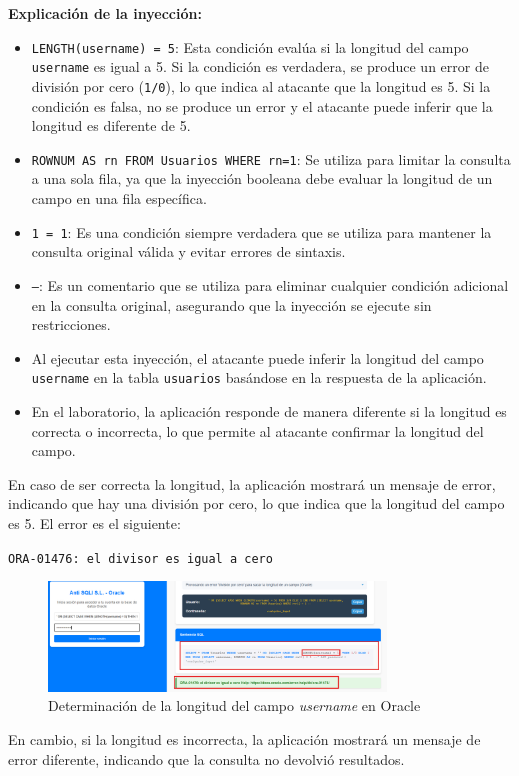 \documentclass[a4paper,12pt]{article}
\begin{document}
\textbf{Explicación de la inyección:}
\begin{itemize}
    \item \texttt{LENGTH(username) = 5}: Esta condición evalúa si la longitud del campo \texttt{username} es igual a 5. Si la condición es verdadera, se produce un error de división por cero (\texttt{1/0}), lo que indica al atacante que la longitud es 5. Si la condición es falsa, no se produce un error y el atacante puede inferir que la longitud es diferente de 5.
    \item \texttt{ROWNUM AS rn FROM Usuarios WHERE rn=1}: Se utiliza para limitar la consulta a una sola fila, ya que la inyección booleana debe evaluar la longitud de un campo en una fila específica.
    \item \texttt{1 = 1}: Es una condición siempre verdadera que se utiliza para mantener la consulta original válida y evitar errores de sintaxis.
    \item \texttt{--}: Es un comentario que se utiliza para eliminar cualquier condición adicional en la consulta original, asegurando que la inyección se ejecute sin restricciones.
    \item Al ejecutar esta inyección, el atacante puede inferir la longitud del campo \texttt{username} en la tabla \texttt{usuarios} basándose en la respuesta de la aplicación.
    \item En el laboratorio, la aplicación responde de manera diferente si la longitud es correcta o incorrecta, lo que permite al atacante confirmar la longitud del campo.
\end{itemize}

En caso de ser correcta la longitud, la aplicación mostrará un mensaje de error, indicando que hay una división por cero, lo que indica que la longitud del campo es 5. El error es el siguiente: 

\texttt{ORA-01476: el divisor es igual a cero }

\begin{figure}[H]
    \centering
    \includegraphics[width=0.8\textwidth]{Imagenes/BooleanSQLINumCT.png}
    \caption{Determinación de la longitud del campo \textit{username} en Oracle}
\end{figure}

En cambio, si la longitud es incorrecta, la aplicación mostrará un mensaje de error diferente, indicando que la consulta no devolvió resultados.




\end{document}
